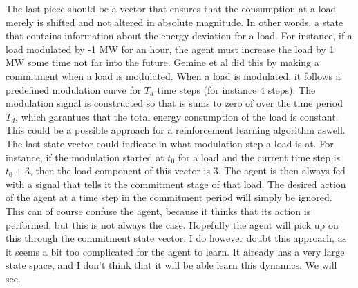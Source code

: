 \documentclass[class=book, crop=false]{standalone}
\begin{document}
The last piece should be a vector that ensures that the consumption at a load merely is shifted and not altered in absolute magnitude. In other words, a state that contains information about the energy deviation for a load. For instance, if a load modulated by -1 MW for an hour, the agent must increase the load by 1 MW some time not far into the future. Gemine et al did this by making a commitment when a load is modulated. When a load is modulated, it follows a predefined modulation curve for $T_{d}$ time steps (for instance 4 steps). The modulation signal is constructed so that is sums to zero of over the time period $T_{d}$, which garantues that the total energy consumption of the load is constant. This could be a possible approach for a reinforcement learning algorithm aswell. The last state vector could indicate in what modulation step a load is at. For instance, if the modulation started at $t_{0}$ for a load and the current time step is $t_{0} + 3$, then the load component of this vector is 3. The agent is then always fed with a signal that tells it the commitment stage of that load. The desired action of the agent at a time step in the commitment period will simply be ignored. This can of course confuse the agent, because it thinks that its action is performed, but this is not always the case. Hopefully the agent will pick up on this through the commitment state vector. I do however doubt this approach, as it seems a bit too complicated for the agent to learn. It already has a very large state space, and I don't think that it will be able learn this dynamics. We will see.
\end{document}

